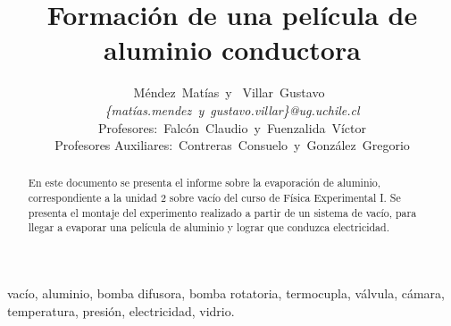 \documentclass[journal]{IEEEtran}
\begin{document}
\title{Formación de una película de aluminio conductora}
\author{Méndez~Matías~y~
        Villar~Gustavo~\\
				\textit{\{matías.mendez~y~gustavo.villar\}@ug.uchile.cl}\\
				Profesores:~Falcón~Claudio~y~Fuenzalida~Víctor\\
				Profesores Auxiliares:~Contreras~Consuelo~y~González~Gregorio}

\maketitle

\begin{abstract}
En este documento se presenta el informe sobre la evaporación de aluminio, correspondiente a la unidad 2 sobre vacío del curso de Física Experimental I. Se presenta el montaje del experimento realizado a partir de un sistema de vacío, para llegar a evaporar una película de aluminio y lograr que conduzca electricidad.
\end{abstract}
\begin{IEEEkeywords}
vacío, aluminio, bomba difusora, bomba rotatoria, termocupla, válvula, cámara, temperatura, presión, electricidad, vidrio. 
\end{IEEEkeywords}
\end{document}
